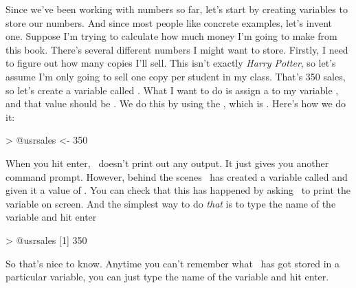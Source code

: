 Since we've been working with numbers so far, let's start by creating variables to store our numbers. And since most people like concrete examples, let's invent one. Suppose I'm trying to calculate how much money I'm going to make from this book. There's several different numbers I might want to store. Firstly, I need to figure out how many copies I'll sell. This isn't exactly {\it Harry Potter}, so let's assume I'm only going to sell one copy per student in my class. That's 350 sales, so let's create a variable called . What I want to do is assign a  to my variable , and that value should be . We do this by using the , which is \rtext{<-}. Here's how we do it:
\begin{rblock1}
> @usr{sales <- 350}
\end{rblock1}
When you hit enter, \R\ doesn't print out any output. It just gives you another command prompt. However, behind the scenes \R\ has created a variable called  and given it a value of . You can check that this has happened by asking \R\ to print the variable on screen. And the simplest way to do {\it that} is to type the name of the variable and hit enter
\begin{rblock1}
> @usr{sales}
[1] 350
\end{rblock1}
So that's nice to know. Anytime you can't remember what \R\ has got stored in a particular variable, you can just type the name of the variable and hit enter. 


